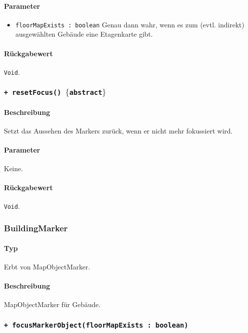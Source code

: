 \paragraph*{Parameter}
\begin{itemize}
    \item \texttt{floorMapExists : boolean} Genau dann wahr, wenn es zum (evtl. indirekt) ausgewählten Gebäude eine Etagenkarte gibt.
\end{itemize}
\paragraph*{Rückgabewert}
\texttt{Void}.

\subsubsection*{\texttt{+ resetFocus() $\lbrace$abstract$\rbrace$}}%
\paragraph*{Beschreibung}
Setzt das Aussehen des Markers zurück, wenn er nicht mehr fokussiert wird.
\paragraph*{Parameter}
Keine.
\paragraph*{Rückgabewert}
\texttt{Void}.

\subsubsection{BuildingMarker}\label{App_Map_View_BuildingMarker}
\paragraph*{Typ} 
Erbt von MapObjectMarker.
\paragraph*{Beschreibung}
MapObjectMarker für Gebäude.

\subsubsection*{\texttt{+ focusMarkerObject(floorMapExists : boolean)}}%
